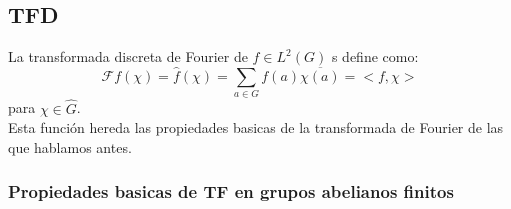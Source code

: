 \documentclass[a4paper,openright,10pt]{article}
\begin{document}
\subsection{TFD}
La transformada discreta de Fourier de $f \in L^{2}(G)$ s define como:$$
\mathcal{F}f(\chi)=\hat{f}(\chi)=\sum\limits_{a\in G} f(a) \overline{\chi(a)}=<f,  \chi>$$ para $\chi \in \hat{G}$.\\
Esta funci\'on hereda las propiedades basicas de la transformada de Fourier de las que hablamos antes.

\subsubsection{Propiedades basicas de TF en grupos abelianos finitos}
\end{document}
